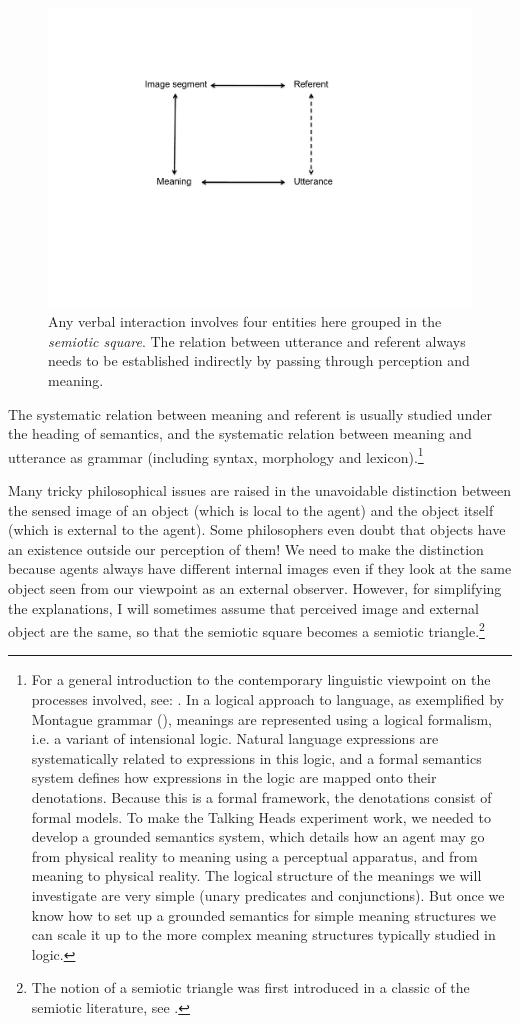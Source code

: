 \begin{figure}[htbp]
  \centerline{\includegraphics[width=.65\textwidth]{chap2/figs/triangle}}
\caption{\label{triangle} Any verbal interaction
involves four entities here grouped in the
{\it semiotic square}. The relation between utterance
and referent always needs to be established indirectly by 
passing through perception and meaning.}
\end{figure}

The systematic relation between meaning and referent is 
usually studied under the heading of semantics, and the 
systematic relation between meaning and utterance as
grammar (including syntax, morphology and lexicon).\footnote{
For a general introduction to the contemporary linguistic
viewpoint on the processes involved, see: \cite{Vanvalin:1997}. 
In a logical approach to language, as 
exemplified by Montague grammar (\cite{Montague:1974}),  
meanings are represented using a logical formalism, i.e.
a variant of intensional logic. 
Natural language expressions are systematically 
related to expressions in this logic, and a
formal semantics system defines how expressions in the logic
are mapped onto their denotations. Because this is 
a formal framework, the denotations consist of formal 
models. To make the Talking Heads experiment work, 
we needed to develop a grounded semantics system, which details
how an agent may go from physical reality to meaning
using a perceptual apparatus, and from meaning 
to physical reality. The logical structure of 
the meanings we will investigate are very simple 
(unary predicates and conjunctions). But once we know how to 
set up a grounded semantics for simple meaning
structures we can scale it up to the more complex meaning
structures typically studied in logic.}

Many tricky philosophical issues are raised in 
the unavoidable distinction between the sensed image
of an object (which is local to the agent)
and the object itself (which is external to the 
agent). Some philosophers even doubt that objects 
have an existence outside our perception of them! 
We need to make the distinction because agents always
have different internal images even if they look at 
the same object seen from our viewpoint as an external
observer. However, for simplifying the 
explanations, I will sometimes assume that perceived
image and external object are the same, so that the 
semiotic square becomes a semiotic triangle.\footnote{
The notion of a semiotic triangle was first
introduced in a classic of the semiotic literature, 
see \cite{Ogden:1935}.}

